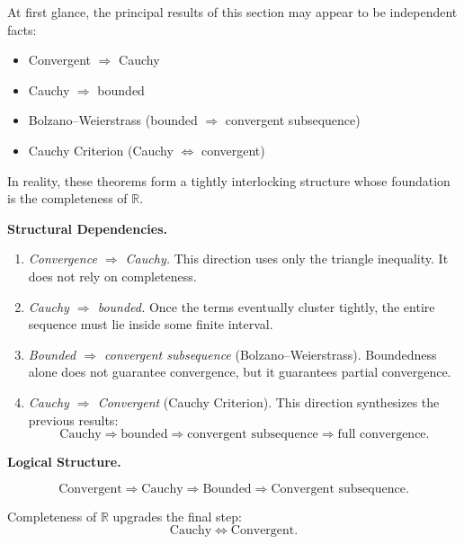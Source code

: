 \begin{remark}

At first glance, the principal results of this section may appear to be
independent facts:

\begin{itemize}
    \item Convergent $\Rightarrow$ Cauchy
    \item Cauchy $\Rightarrow$ bounded
    \item Bolzano--Weierstrass (bounded $\Rightarrow$ convergent subsequence)
    \item Cauchy Criterion (Cauchy $\Leftrightarrow$ convergent)
\end{itemize}

In reality, these theorems form a tightly interlocking structure whose
foundation is the completeness of $\mathbb{R}$.

\medskip

\textbf{Structural Dependencies.}

\begin{enumerate}
    \item \emph{Convergence $\Rightarrow$ Cauchy.}  
    This direction uses only the triangle inequality.
    It does not rely on completeness.

    \item \emph{Cauchy $\Rightarrow$ bounded.}  
    Once the terms eventually cluster tightly,
    the entire sequence must lie inside some finite interval.

    \item \emph{Bounded $\Rightarrow$ convergent subsequence} (Bolzano--Weierstrass).  
    Boundedness alone does not guarantee convergence,
    but it guarantees partial convergence.

    \item \emph{Cauchy $\Rightarrow$ Convergent} (Cauchy Criterion).  
    This direction synthesizes the previous results:
    \[
    \text{Cauchy}
    \Rightarrow
    \text{bounded}
    \Rightarrow
    \text{convergent subsequence}
    \Rightarrow
    \text{full convergence}.
    \]
\end{enumerate}

\medskip

\textbf{Logical Structure.}

\[
\text{Convergent}
\Rightarrow
\text{Cauchy}
\Rightarrow
\text{Bounded}
\Rightarrow
\text{Convergent subsequence}.
\]

Completeness of $\mathbb{R}$ upgrades the final step:
\[
\text{Cauchy}
\Longleftrightarrow
\text{Convergent}.
\]


\end{remark}
